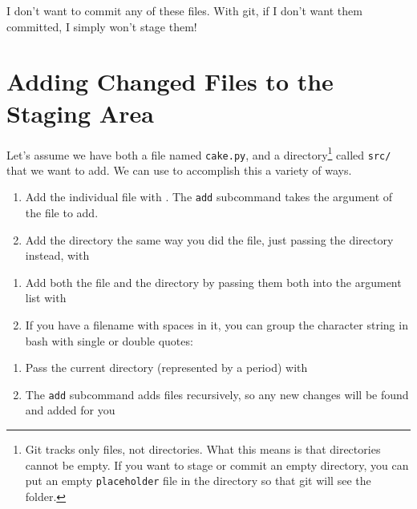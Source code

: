 \documentclass[11pt,letterpaper,twoside]{report}
\begin{document}
I don't want to commit any of these files. With git, if I don't want them
committed, I simply won't stage them!

\section{Adding Changed Files to the Staging Area}
Let's assume we have both a file named \texttt{cake.py}, and a
directory\footnote{Git tracks only files, not directories. What this means is
that directories cannot be empty. If you want to stage or commit an empty
directory, you can put an empty \texttt{placeholder} file in the directory so
that git will see the folder.} called \texttt{src/} that we want to add. We can
use  to accomplish this a variety of ways.

\vspace{.5em}\noindent
{}
\begin{enumerate}
\item Add the individual file with . The \texttt{add}
    subcommand takes the argument of the file to add.
\item Add the directory the same way you did the file, just passing the
    directory instead, with 
\end{enumerate}

\noindent
{}
\begin{enumerate}
\item Add both the file and the directory by passing them both into the argument
    list with 
\item If you have a filename with spaces in it, you can group the character
    string in bash with single or double quotes:
\end{enumerate}

\noindent
{}
\begin{enumerate}
\item Pass the current directory (represented by a period) with
\item The \texttt{add} subcommand adds files recursively, so any new changes
    will be found and added for you
\end{enumerate}

\end{document}
